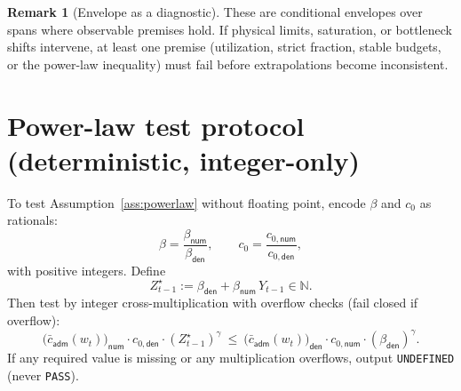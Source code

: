 \documentclass[11pt]{article}
\newcommand{\N}{\mathbb{N}}
\newcommand{\1}{\mathbf{1}}
\theoremstyle{definition}
\newtheorem{remark}{Remark}
\theoremstyle{plain}
\begin{document}
\begin{remark}[Envelope as a diagnostic]
These are conditional envelopes over spans where observable premises hold. If physical limits, saturation, or bottleneck shifts intervene, at least one premise (utilization, strict fraction, stable budgets, or the power-law inequality) must fail before extrapolations become inconsistent.
\end{remark}

\appendix

\section{Power-law test protocol (deterministic, integer-only)}
\label{sec:powerlaw_test}

To test Assumption~\ref{ass:powerlaw} without floating point, encode $\beta$ and $c_0$ as rationals:
\[
\beta=\frac{\beta_{\textsf{num}}}{\beta_{\textsf{den}}},\qquad c_0=\frac{c_{0,\textsf{num}}}{c_{0,\textsf{den}}},
\]
with positive integers. Define
\[
Z^\star_{t-1}:=\beta_{\textsf{den}} + \beta_{\textsf{num}}\,Y_{t-1}\in\N.
\]
Then test by integer cross-multiplication with overflow checks (fail closed if overflow):
\[
\bigl(\bar c_{\textsf{adm}}(w_t)\bigr)_{\textsf{num}}\cdot c_{0,\textsf{den}}\cdot (Z^\star_{t-1})^\gamma
\ \le\
\bigl(\bar c_{\textsf{adm}}(w_t)\bigr)_{\textsf{den}}\cdot c_{0,\textsf{num}}\cdot (\beta_{\textsf{den}})^\gamma.
\]
If any required value is missing or any multiplication overflows, output \texttt{UNDEFINED} (never \texttt{PASS}).
\end{document}
